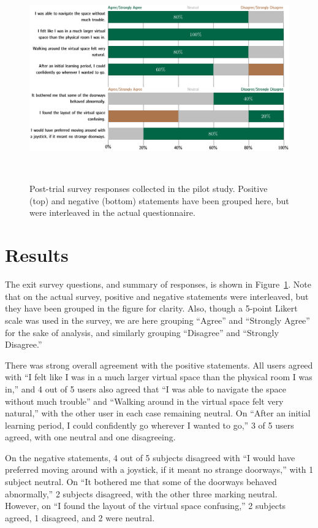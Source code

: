 \documentclass{sigchi}
\begin{document}
\begin{figure}[htb]
  \centering
  \includegraphics[width=1.75\columnwidth]{figures/LikertChart.pdf}
  \caption{Post-trial survey responses collected in the pilot study.  Positive (top) and negative (bottom) statements have been grouped here, but were interleaved in the actual questionnaire.}~\label{fig:likertChart}
\end{figure}

\section{Results}

The exit survey questions, and summary of responses, is shown in Figure~\ref{fig:likertChart}.  Note that on the actual survey, positive and negative statements were interleaved, but they have been grouped in the figure for clarity.  Also, though a 5-point Likert scale was used in the survey, we are here grouping “Agree” and “Strongly Agree” for the sake of analysis, and similarly grouping “Disagree” and “Strongly Disagree.”

There was strong overall agreement with the positive statements.  All users agreed with “I felt like I was in a much larger virtual space than the physical room I was in,” and 4 out of 5 users also agreed that “I was able to navigate the space without much trouble” and “Walking around in the virtual space felt very natural,” with the other user in each case remaining neutral.  On “After an initial learning period, I could confidently go wherever I wanted to go,” 3 of 5 users agreed, with one neutral and one disagreeing.

On the negative statements, 4 out of 5 subjects disagreed with “I would have preferred moving around with a joystick, if it meant no strange doorways,” with 1 subject neutral.  On “It bothered me that some of the doorways behaved abnormally,” 2 subjects disagreed, with the other three marking neutral.  However, on “I found the layout of the virtual space confusing,” 2 subjects agreed, 1 disagreed, and 2 were neutral.
\end{document}

